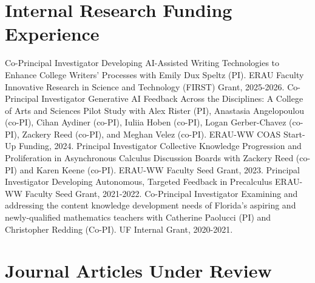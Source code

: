 \documentclass[10pt,a4paper,sans]{moderncv}
\newcounter{underReviewArticleCounter}
\newcommand{\underReviewArticle}[1]{%
	\stepcounter{underReviewArticleCounter}
	\cvitem{[\arabic{underReviewArticleCounter}]}{%
		#1
	}
}
\begin{document}
\section{Internal Research Funding Experience}
	{Co-Principal Investigator}
	{Developing AI-Assisted Writing Technologies to Enhance College Writers’ Processes}
	{with Emily Dux Speltz (PI). 
	ERAU Faculty Innovative Research in Science and Technology (FIRST) Grant, 2025-2026.}
	{}{}
	{Co-Principal Investigator}
	{Generative AI Feedback Across the Disciplines: A College of Arts and Sciences Pilot Study}
	{with Alex Rister (PI), Anastasia Angelopoulou (co-PI), Cihan Aydiner (co-PI), Iuliia Hoben (co-PI), Logan Gerber-Chavez (co-PI), Zackery Reed (co-PI), and Meghan Velez (co-PI). 
	ERAU-WW COAS Start-Up Funding, 2024.}
	{}{}
	{Principal Investigator}
	{Collective Knowledge Progression and Proliferation in Asynchronous Calculus Discussion Boards}
	{with Zackery Reed (co-PI) and Karen Keene (co-PI). 
	ERAU-WW Faculty Seed Grant, 2023.}
	{}{}
	{Principal Investigator}
	{Developing Autonomous, Targeted Feedback in Precalculus}
	{ERAU-WW Faculty Seed Grant, 2021-2022.}
	{}{}
	{Co-Principal Investigator}
	{Examining and addressing the content knowledge development needs of Florida's aspiring and newly-qualified mathematics teachers}
	{with Catherine Paolucci (PI) and Christopher Redding (Co-PI). 
	UF Internal Grant, 2020-2021.}
	{}{}

\section{Journal Articles Under Review}

\end{document}

